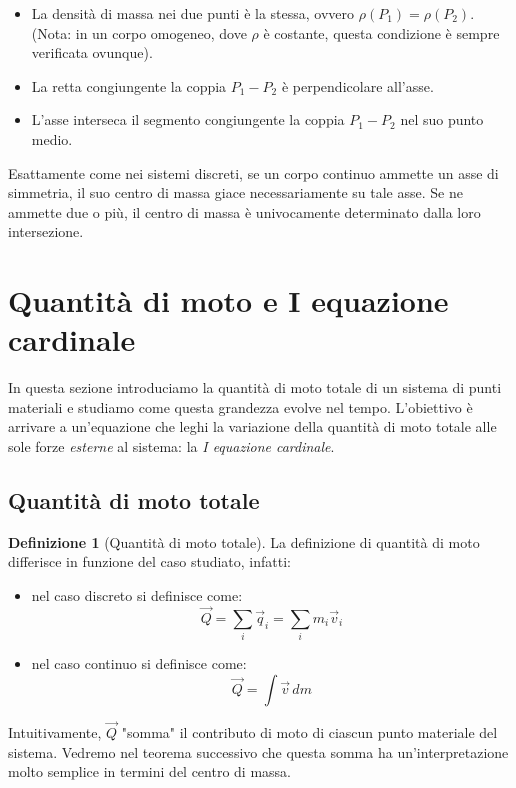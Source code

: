 \documentclass[11pt, a4paper, openright]{book}
\theoremstyle{plain}
\theoremstyle{definition}
\newtheorem{definizione}{Definizione}[section]
\begin{document}
\begin{itemize}
    \item La densità di massa nei due punti è la stessa, ovvero $\rho(P_1) = \rho(P_2)$. (Nota: in un corpo omogeneo, dove $\rho$ è costante, questa condizione è sempre verificata ovunque).
    \item La retta congiungente la coppia $P_1-P_2$ è perpendicolare all'asse.
    \item L'asse interseca il segmento congiungente la coppia $P_1-P_2$ nel suo punto medio.
\end{itemize}

Esattamente come nei sistemi discreti, se un corpo continuo ammette un asse di simmetria, il suo centro di massa giace necessariamente su tale asse. Se ne ammette due o più, il centro di massa è univocamente determinato dalla loro intersezione.

\section{Quantità di moto e I equazione cardinale}
\label{sec:quantita-moto}

In questa sezione introduciamo la quantità di moto totale di un sistema
di punti materiali e studiamo come questa grandezza evolve nel tempo.
L'obiettivo è arrivare a un'equazione che leghi la variazione della
quantità di moto totale alle sole forze \emph{esterne} al sistema: la
\emph{I equazione cardinale}.

\subsection{Quantità di moto totale}
\label{subsec:quantita-moto-totale}

\begin{definizione}[Quantità di moto totale]
\label{def:quantita-moto-totale}
La definizione di quantità di moto differisce in funzione del caso studiato, infatti:
\begin{itemize}
    \item nel caso discreto si definisce come:
    \[\vec{Q} = \sum_i \vec{q}_i = \sum_i m_i\vec{v}_i\]
    \item nel caso continuo si definisce come:
    \[\vec{Q} = \int\vec{v}\,dm\]
\end{itemize}
\end{definizione}

Intuitivamente, $\vec{Q}$ "somma" il contributo di moto di ciascun punto
materiale del sistema. Vedremo nel teorema successivo che questa somma
ha un'interpretazione molto semplice in termini del centro di massa.
\end{document}
